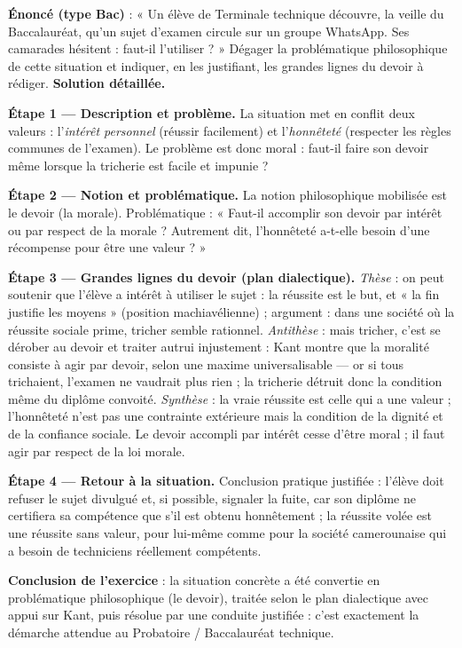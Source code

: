 \documentclass[11pt]{article}
\newcommand{\cle}[1]{{\popxbold\color{popdark}#1}}
\begin{document}
\begin{exoresolu}
\textbf{Énoncé (type Bac)} : « Un élève de Terminale technique découvre, la veille du Baccalauréat, qu'un sujet d'examen circule sur un groupe WhatsApp. Ses camarades hésitent : faut-il l'utiliser ? » Dégager la problématique philosophique de cette situation et indiquer, en les justifiant, les grandes lignes du devoir à rédiger.
\tcblower
\textbf{Solution détaillée.}

\textbf{Étape 1 — Description et problème.} La situation met en conflit deux valeurs : l'\emph{intérêt personnel} (réussir facilement) et l'\emph{honnêteté} (respecter les règles communes de l'examen). Le problème est donc moral : faut-il faire son devoir même lorsque la tricherie est facile et impunie ?

\textbf{Étape 2 — Notion et problématique.} La notion philosophique mobilisée est le \cle{devoir} (la morale). Problématique : « Faut-il accomplir son devoir par intérêt ou par respect de la morale ? Autrement dit, l'honnêteté a-t-elle besoin d'une récompense pour être une valeur ? »

\textbf{Étape 3 — Grandes lignes du devoir (plan dialectique).}
\emph{Thèse} : on peut soutenir que l'élève a intérêt à utiliser le sujet : la réussite est le but, et « la fin justifie les moyens » (position machiavélienne) ; argument : dans une société où la réussite sociale prime, tricher semble rationnel.
\emph{Antithèse} : mais tricher, c'est se dérober au devoir et traiter autrui injustement : Kant montre que la moralité consiste à agir par devoir, selon une maxime universalisable — or si tous trichaient, l'examen ne vaudrait plus rien ; la tricherie détruit donc la condition même du diplôme convoité.
\emph{Synthèse} : la vraie réussite est celle qui a une valeur ; l'honnêteté n'est pas une contrainte extérieure mais la condition de la dignité et de la confiance sociale. Le devoir accompli par intérêt cesse d'être moral ; il faut agir par respect de la loi morale.

\textbf{Étape 4 — Retour à la situation.} Conclusion pratique justifiée : l'élève doit refuser le sujet divulgué et, si possible, signaler la fuite, car son diplôme ne certifiera sa compétence que s'il est obtenu honnêtement ; la réussite volée est une réussite sans valeur, pour lui-même comme pour la société camerounaise qui a besoin de techniciens réellement compétents.

\textbf{Conclusion de l'exercice} : la situation concrète a été convertie en problématique philosophique (le devoir), traitée selon le plan dialectique avec appui sur Kant, puis résolue par une conduite justifiée : c'est exactement la démarche attendue au Probatoire / Baccalauréat technique.
\end{exoresolu}
\end{document}
